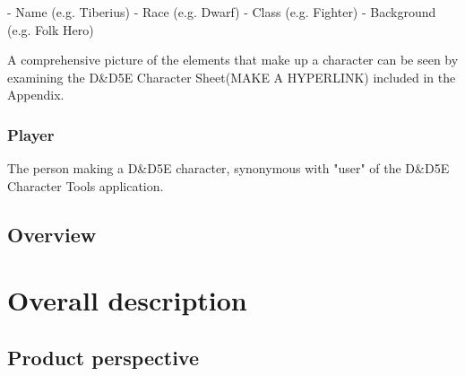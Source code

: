 \documentclass{article}
\begin{document}
- Name (e.g. Tiberius)
- Race (e.g. Dwarf)
- Class (e.g. Fighter)
- Background (e.g. Folk Hero)

A comprehensive picture of the elements that make up a character can be seen by examining the D\&D5E Character Sheet(MAKE A HYPERLINK) included in the Appendix.

\subsubsection{Player}
The person making a D\&D5E character, synonymous with "user" of the D\&D5E Character Tools application.



\subsection{Overview}






\section{Overall description}

\subsection{Product perspective}
\end{document}
